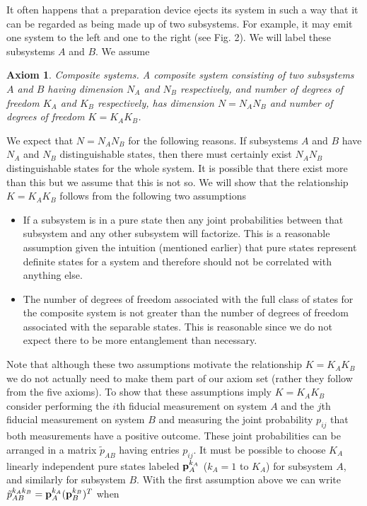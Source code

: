 \documentclass[10pt,twocolumn]{article}
\newtheorem{axiom}{Axiom}
\begin{document}
It often happens that a preparation device ejects its system in such a
way that it can be regarded as being made up of two subsystems.  For
example, it may emit one system to the left and one to the right (see
Fig. 2).  We will label these subsystems $A$ and $B$.  We assume
\begin{axiom} {\rm Composite systems.}  A composite system consisting of two
subsystems $A$ and $B$ having dimension $N_A$ and $N_B$
respectively, and number of degrees of freedom $K_A$ and $K_B$
respectively, has dimension $N=N_AN_B$ and number of degrees of freedom
$K=K_AK_B$.
\end{axiom}
We expect that $N=N_AN_B$ for the following reasons. If
subsystems $A$ and $B$ have $N_A$ and $N_B$ distinguishable states, then
there must certainly exist $N_AN_B$ distinguishable states for the
whole system.  It is possible that there exist more than this but we
assume that this is not so.
We will show that the relationship $K=K_AK_B$ follows from the following
two assumptions
\begin{itemize}
\item If a subsystem is in a pure state then any joint probabilities
between that subsystem and any other subsystem will factorize.  This is
a reasonable assumption given the intuition (mentioned earlier)
that pure states represent definite states for a system and therefore
should not be correlated with anything else.
\item The number of degrees of freedom associated with the full class of
states for the composite system is not greater than the number of
degrees of freedom associated with the separable states.  This is
reasonable since we do not expect there to be more entanglement than
necessary.
\end{itemize}
Note that although these two assumptions motivate the relationship
$K=K_AK_B$ we do not actually need to make them part of our axiom set
(rather they follow from the five axioms).
To show that these assumptions imply $K=K_AK_B$ consider
performing the $i$th
fiducial measurement on system $A$ and the $j$th fiducial measurement on
system $B$ and measuring the joint probability $p_{ij}$ that both
measurements have a positive outcome. These joint probabilities can be
arranged in a matrix $\tilde{p}_{AB}$ having entries $p_{ij}$.
It must be possible to choose $K_A$ linearly independent pure states
labeled ${\bf p}^{k_A}_A$ ($k_A=1$ to $K_A$) for subsystem $A$, and
similarly for subsystem $B$. With the first assumption above we can write
$\tilde{p}^{k_A k_B}_{AB}={\bf p}^{k_A}_A({\bf p}_B^{k_B})^T$ when
\end{document}
